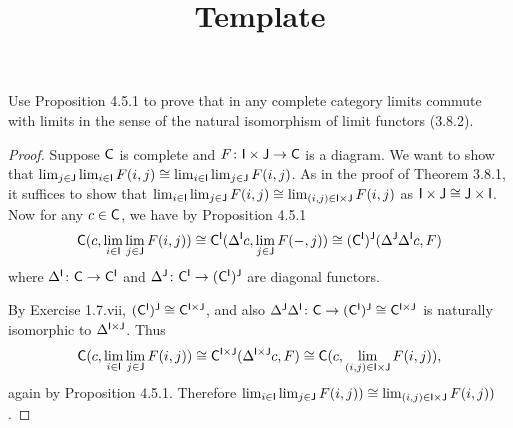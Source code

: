 \documentclass[../../solutions]{subfiles}
\title{Template}
\author{}
\begin{document}
\maketitle

%   

\begin{exercise}
  Use Proposition 4.5.1 to prove that in any complete category limits
  commute with limits in the sense of the natural isomorphism of limit
  functors (3.8.2).
\end{exercise}

\begin{proof}
  Suppose ${\mathsf{C}}$ is complete and ${F}\colon{{\mathsf{I}}\times{\mathsf{J}}}\to{{\mathsf{C}}}$ is a
  diagram.  We want to show that
  $\lim_{j\in{\mathsf{J}}}\lim_{i\in{\mathsf{I}}} F(i,j) \cong
  \lim_{i\in{\mathsf{I}}}\lim_{j\in{\mathsf{J}}} F(i,j)$.  As in the proof of Theorem
  3.8.1, it suffices to show that
  $\lim_{i\in{\mathsf{I}}}\lim_{j\in{\mathsf{J}}} F(i,j)\cong
  \lim_{(i,j)\in{\mathsf{I}}\times{\mathsf{J}}} F(i,j)$ as
  ${\mathsf{I}}\times{\mathsf{J}}\cong {\mathsf{J}}\times{\mathsf{I}}$.  Now for any $c\in{\mathsf{C}}$, we have by
  Proposition 4.5.1
  $${\mathsf{C}}(c,\lim_{i\in{\mathsf{I}}}\lim_{j\in{\mathsf{J}}} F(i,j)) \cong
  {\mathsf{C}}^{\mathsf{I}}(\Delta^{\mathsf{I}} c, \lim_{j\in{\mathsf{J}}} F(-,j)) \cong
  ({\mathsf{C}}^{\mathsf{I}})^{\mathsf{J}}(\Delta^{\mathsf{J}} \Delta^{\mathsf{I}} c, F)$$
  where ${\Delta^{\mathsf{I}}}\colon{{\mathsf{C}}}\to{{\mathsf{C}}^{\mathsf{I}}}$ and
  ${\Delta^{\mathsf{J}}}\colon{{\mathsf{C}}^{\mathsf{I}}}\to{({\mathsf{C}}^{\mathsf{I}})^{\mathsf{J}}}$ are diagonal functors.

  By Exercise 1.7.vii, $({\mathsf{C}}^{\mathsf{I}})^{\mathsf{J}}\cong {\mathsf{C}}^{{\mathsf{I}}\times {\mathsf{J}}}$, and
  also
  ${\Delta^{\mathsf{J}} \Delta^{\mathsf{I}}}\colon{{\mathsf{C}}}\to{({\mathsf{C}}^{\mathsf{I}})^{\mathsf{J}}\cong {\mathsf{C}}^{{\mathsf{I}}\times
      {\mathsf{J}}}}$ is naturally isomorphic to $\Delta^{{\mathsf{I}}\times {\mathsf{J}}}$.
  Thus
  $${\mathsf{C}}(c,\lim_{i\in{\mathsf{I}}}\lim_{j\in{\mathsf{J}}} F(i,j)) \cong
  {\mathsf{C}}^{{\mathsf{I}}\times {\mathsf{J}}}(\Delta^{{\mathsf{I}}\times {\mathsf{J}}} c, F) \cong
  {\mathsf{C}}(c, \lim_{(i,j)\in{\mathsf{I}}\times {\mathsf{J}}} F(i,j)),$$
  again by Proposition 4.5.1.  Therefore
  $\lim_{i\in{\mathsf{I}}}\lim_{j\in{\mathsf{J}}} F(i,j)) \cong \lim_{(i,j)\in{\mathsf{I}}\times
    {\mathsf{J}}} F(i,j))$.
\end{proof}
\end{document}
